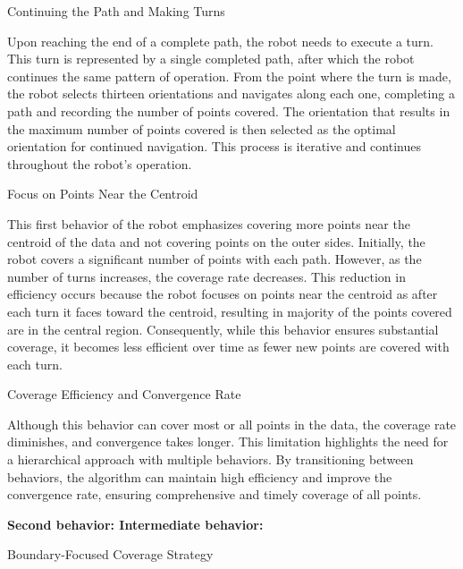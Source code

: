 \vspace*{6mm}  

Continuing the Path and Making Turns

Upon reaching the end of a complete path, the robot needs to execute a turn. This turn is represented by a single completed path, after which the robot continues the same pattern of operation. From the point where the turn is made, the robot selects thirteen orientations and navigates along each one, completing a path and recording the number of points covered. The orientation that results in the maximum number of points covered is then selected as the optimal orientation for continued navigation. This process is iterative and continues throughout the robot's operation.

\vspace*{6mm}  

Focus on Points Near the Centroid

This first behavior of the robot emphasizes covering more points near the centroid of the data and not covering points on the outer sides. Initially, the robot covers a significant number of points with each path. However, as the number of turns increases, the coverage rate decreases. This reduction in efficiency occurs because the robot focuses on points near the centroid as after each turn it faces toward the centroid, resulting in majority of the points covered are in the central region. Consequently, while this behavior ensures substantial coverage, it becomes less efficient over time as fewer new points are covered with each turn.

\vspace*{6mm}  

Coverage Efficiency and Convergence Rate

Although this behavior can cover most or all points in the data, the coverage rate diminishes, and convergence takes longer. This limitation highlights the need for a hierarchical approach with multiple behaviors. By transitioning between behaviors, the algorithm can maintain high efficiency and improve the convergence rate, ensuring comprehensive and timely coverage of all points.

\vspace*{6mm}  



\textbf{Second behavior: Intermediate behavior:} 

\vspace*{6mm}   

Boundary-Focused Coverage Strategy

